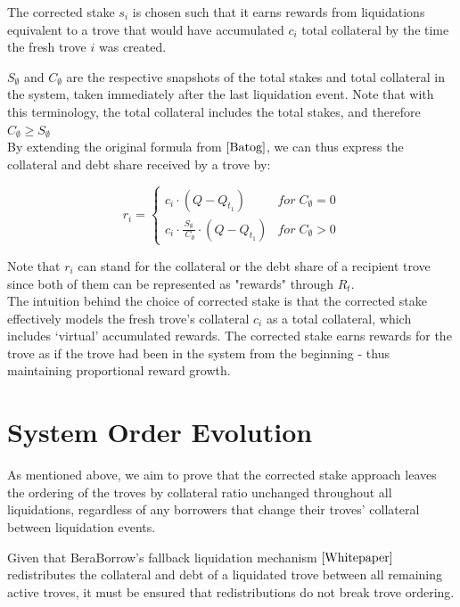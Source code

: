 \documentclass[reqno]{article}
\begin{document}
\bigskip
The corrected stake $s_i$ is chosen such that it earns rewards from liquidations equivalent to a trove that would have accumulated $c_i$ total collateral by the time the fresh trove $i$ was created.
 
$S_\emptyset$ and $C_\emptyset$ are the respective snapshots of the total stakes and total collateral in the system, taken immediately after the last liquidation event. Note that with this terminology, the total collateral includes the total stakes, and therefore $C_\emptyset \ge S_\emptyset$
\\

By extending the original formula from $\cite{Batog}$, we can thus express the collateral and debt share received by a trove by:

\begin{equation}
    r_i=
        \begin{cases} 
            c_i \cdot (Q - Q_{t_1}) & for \;C_\emptyset = 0\\
            c_i \cdot \frac{S_\emptyset} {\;C_\emptyset} \cdot (Q - Q_{t_1}) & for \;C_\emptyset>0
        \end{cases}
\end{equation}

Note that $r_i$ can stand for the collateral or the debt share of a recipient trove since both of them can be represented as "rewards" through $R_t$. \\

The intuition behind the choice of corrected stake is that the corrected stake effectively models the fresh trove’s collateral $c_i$ as a total collateral, which includes ‘virtual’ accumulated rewards. The corrected stake earns rewards for the trove as if the trove had been in the system from the beginning - thus maintaining proportional reward growth.\\

\section{System Order Evolution}

As mentioned above, we aim to prove that the corrected stake approach leaves the ordering of the troves by collateral ratio unchanged throughout all liquidations, regardless of any borrowers that change their troves' collateral between liquidation events.

Given that BeraBorrow's fallback liquidation mechanism $\cite{Whitepaper}$ redistributes the collateral and debt of a liquidated trove between all remaining active troves, it must be  ensured that redistributions do not break trove ordering.
\end{document}
